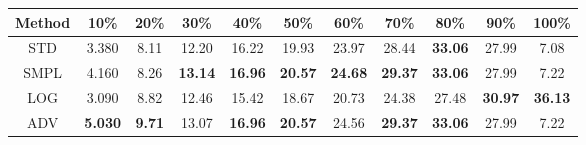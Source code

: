 \documentclass{standalone}
\begin{document}
\begin{tabular}{c|cccccccccc}
      \toprule
      Method & 10\% & 20\% & 30\% & 40\% & 50\% & 60\% & 70\% & 80\% & 90\% & 100\% \\
      \midrule
STD & 3.380 & 8.11 & 12.20 & 16.22 & 19.93 & 23.97 & 28.44 & \textbf{33.06} & 27.99 & 7.08\\
SMPL & 4.160 & 8.26 & \textbf{13.14} & \textbf{16.96} & \textbf{20.57} & \textbf{24.68} & \textbf{29.37} & \textbf{33.06} & 27.99 & 7.22\\
LOG & 3.090 & 8.82 & 12.46 & 15.42 & 18.67 & 20.73 & 24.38 & 27.48 & \textbf{30.97} & \textbf{36.13}\\
ADV & \textbf{5.030} & \textbf{9.71} & 13.07 & \textbf{16.96} & \textbf{20.57} & 24.56 & \textbf{29.37} & \textbf{33.06} & 27.99 & 7.22\\
  \bottomrule
\end{tabular}
\end{document}
